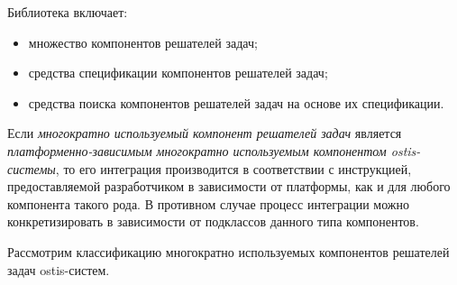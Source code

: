 Библиотека включает:
\begin{itemize}
\item множество компонентов решателей задач;
\item средства спецификации компонентов решателей задач;
\item средства поиска компонентов решателей задач на основе их спецификации.
\end{itemize}

Если \textit{многократно используемый компонент решателей задач} является \textit{платформенно-зависимым многократно используемым компонентом ostis-системы}, то его интеграция производится в соответствии с инструкцией, предоставляемой разработчиком в зависимости от платформы, как и для любого компонента такого рода. В противном случае процесс интеграции можно конкретизировать в зависимости от подклассов данного типа компонентов. 

Рассмотрим классификацию многократно используемых компонентов решателей задач ostis-систем.

